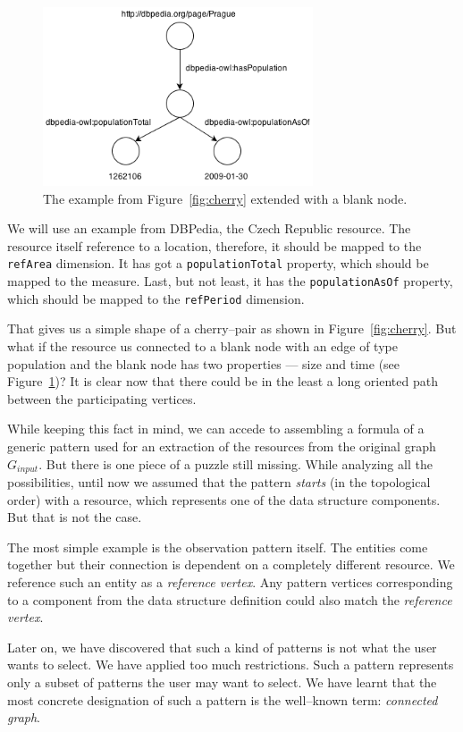 \begin{figure}
	\centering
	\includegraphics[width=80mm]{images/cherry_blank.png}
	\caption{The example from Figure~\ref{fig:cherry} extended with a blank node.}
	\label{fig:cherry-blank}
\end{figure}

We will use an example from DBPedia, 
the Czech Republic resource. The resource itself reference to a location, 
therefore, it should be mapped to the \verb|refArea| dimension. It has got a 
\verb|populationTotal| property, which should be mapped to the measure. Last, but not 
least, it has the \verb|populationAsOf| property, which should be mapped to the 
\verb|refPeriod| dimension.

That gives us a simple shape of a cherry--pair as shown in
Figure~\ref{fig:cherry}. But what 
if the resource us connected to a blank node with an edge of type 
population and the blank node has two properties --- size and time
(see Figure~\ref{fig:cherry-blank})?
It is clear now that there could be in the least a long oriented path between the participating 
vertices.

While keeping this fact in mind, we can accede to assembling a formula of a generic pattern used for an extraction of the resources from the original graph $G_{input}$. But 
there is one piece of a puzzle still missing. While analyzing all the
possibilities, until now we assumed that the pattern \emph{starts} (in the topological order)
with a resource, which represents one of the data structure components. But that is not  
the case.

The most simple example is the observation pattern itself. The 
entities come together but their connection is dependent on a completely 
different resource. We reference such an entity
as a \emph{reference vertex}. Any pattern vertices corresponding to a component from the 
data structure definition could also match the \emph{reference vertex}.

Later on, we have discovered that such a kind of patterns is not what the user 
wants to select. We have applied too much restrictions. Such a pattern
represents only a subset of patterns the user may want to select. We have learnt
that the most concrete designation of such a pattern is the well--known term:
\emph{connected graph}.


